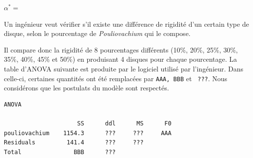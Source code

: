 \begin{questions}
\vfill
$\alpha^*=$ 
\vspace{0.5cm}

\pageblanche

\question 
Un ingénieur veut vérifier s'il existe une différence de rigidité d'un certain type de disque, selon le pourcentage de \textit{Pouliovachium} qui le compose.

Il compare donc la rigidité de 8 pourcentages différents (10\%, 20\%, 25\%, 30\%, 35\%, 40\%, 45\% et 50\%) en produisant 4 disques pour chaque pourcentage.
La table d'ANOVA suivante est produite par le logiciel utilisé par l'ingénieur. 
Dans celle-ci, certaines quantités ont été remplacées par \texttt{AAA, BBB} et \texttt{ ???}. Nous considérons que les postulats du modèle sont respectés.
\begin{verbatim}
ANOVA

                     SS      ddl      MS      F0           
pouliovachium    1154.3      ???     ???     AAA
Residuals         141.4      ???     ???         
Total               BBB      ???       
\end{verbatim}

\end{questions}
